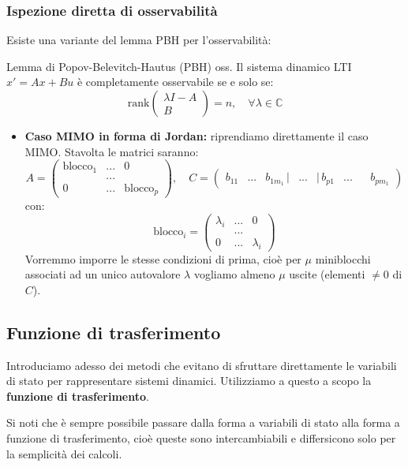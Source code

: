 \documentclass[a4paper,11pt]{article}
\begin{document}
\subsubsection{Ispezione diretta di osservabilità}
Esiste una variante del lemma PBH per l'osservabilità:
		\begin{theorem}{Lemma di Popov-Belevitch-Hautus (PBH) oss.}
			Il sistema dinamico LTI $x' = Ax + Bu$ è completamente osservabile se e solo se: $$\mathrm{rank}\begin{pmatrix}
			\lambda I - A \\ B
			\end{pmatrix} = n, \quad \forall \lambda \in \mathbb{C}$$
		\end{theorem}
		
		\begin{itemize}
			\item \textbf{Caso MIMO in forma di Jordan:} riprendiamo direttamente il caso MIMO. Stavolta le matrici saranno:
		$$
			A = \begin{pmatrix}
				\text{blocco}_1 & ... & 0 \\
												& ... & \\
				0 & ... & \text{blocco}_p
			\end{pmatrix}, \quad C = \begin{pmatrix}
				b_{11} & ... & b_{1m_1} \, | & ... & | \, b_{p1} & ... &&b_{pm_1}
			\end{pmatrix}
		$$
		con:
		$$
			\text{blocco}_i = \begin{pmatrix}
				\lambda_i & ... & 0 \\
				& ... & \\ 
				0 & ... & \lambda_i
			\end{pmatrix}
		$$
		Vorremmo imporre le stesse condizioni di prima, cioè per $\mu$ miniblocchi associati ad un unico autovalore $\lambda$ vogliamo almeno $\mu$ uscite (elementi $\neq 0$ di $C$).

		\end{itemize}

\subsection{Funzione di trasferimento}
Introduciamo adesso dei metodi che evitano di sfruttare direttamente le variabili di stato per rappresentare sistemi dinamici.
Utilizziamo a questo a scopo la \textbf{funzione di trasferimento}.

Si noti che è sempre possibile passare dalla forma a variabili di stato alla forma a funzione di trasferimento, cioè queste sono intercambiabili e differsicono solo per la semplicità dei calcoli.
\end{document}

